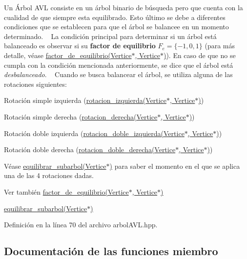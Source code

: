 Un Árbol A\+VL consiste en un árbol binario de búsqueda pero que cuenta con la cualidad de que siempre esta equilibrado. Esto último se debe a diferentes condiciones que se establecen para que el árbol se balancee en un momento determinado. ~\newline
 La condición principal para determinar si un árbol está balanceado es observar si su {\bfseries factor de equilibrio} $F_e = \{-1,0,1\}$ (para más detalle, véase \hyperlink{classArbolAVL_a8cf229fd1482232fbfe4803043eeec14}{factor\+\_\+de\+\_\+equilibrio(\+Vertice$\ast$, Vertice$\ast$)}). En caso de que no se cumpla con la condición mencionada anteriormente, se dice que el árbol está {\itshape desbalanceado}. ~\newline
 Cuando se busca balancear el árbol, se utiliza alguna de las rotaciones siguientes\+:
\begin{DoxyItemize}
\item Rotación simple izquierda (\hyperlink{classArbolAVL_abfaf2247b607b040e328391ec8621546}{rotacion\+\_\+izquierda(\+Vertice$\ast$, Vertice$\ast$)})
\item Rotación simple derecha (\hyperlink{classArbolAVL_a33dfba0b6e53caa0f2e4b71a8d2c6a7e}{rotacion\+\_\+derecha(\+Vertice$\ast$, Vertice$\ast$)})
\item Rotación doble izquierda (\hyperlink{classArbolAVL_a3115c59bd2be761c530eeeb11a169700}{rotacion\+\_\+doble\+\_\+izquierda(\+Vertice$\ast$, Vertice$\ast$)})
\item Rotación doble derecha (\hyperlink{classArbolAVL_aa481f6a1014b68159b1fe753b96bde62}{rotacion\+\_\+doble\+\_\+derecha(\+Vertice$\ast$, Vertice$\ast$)})
\end{DoxyItemize}

Véase \hyperlink{classArbolAVL_ad24ffafb198dac21a98ff19e8361fbd6}{equilibrar\+\_\+subarbol(\+Vertice$\ast$)} para saber el momento en el que se aplica una de las 4 rotaciones dadas. \begin{DoxySeeAlso}{Ver también}
\hyperlink{classArbolAVL_a8cf229fd1482232fbfe4803043eeec14}{factor\+\_\+de\+\_\+equilibrio(\+Vertice$\ast$, Vertice$\ast$)} 

\hyperlink{classArbolAVL_ad24ffafb198dac21a98ff19e8361fbd6}{equilibrar\+\_\+subarbol(\+Vertice$\ast$)} 
\end{DoxySeeAlso}


Definición en la línea 70 del archivo arbol\+A\+V\+L.\+hpp.



\subsection{Documentación de las funciones miembro}
\mbox{\label{classArbolAVL_ac88b4af2e6b96775793a981baba0763a}} 
